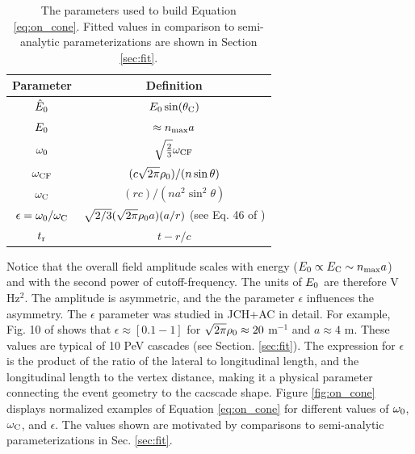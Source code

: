 \documentclass[amsmath,amssymb,aps,prd,10pt,twocolumn]{revtex4}
\begin{document}
\begin{table}
\renewcommand{\arraystretch}{1.5}
\begin{tabular}{| c | c |}
\hline
Parameter & Definition \\ \hline
$\hat{E}_{\rm 0}$ & $E_{\rm 0} \sin(\theta_{\rm C})$ \\
$E_{\rm 0}$ & $\approx n_{\rm max}a$ \\
$\omega_{\rm 0}$ & $\sqrt{\frac{2}{3}} \omega_{\rm CF}$ \\
$\omega_{\rm CF}$ & $(c\sqrt{2\pi}\rho_{\rm 0})/(n\sin\theta)$ \\
$\omega_{\rm C}$ & $(rc)/(na^2\sin^2\theta)$ \\
$\epsilon = \omega_{\rm 0}/\omega_{\rm C}$ & $\sqrt{2/3} (\sqrt{2\pi} \rho_{\rm 0} a) (a/r) $ (see Eq. 46 of \cite{10.1016/j.astropartphys.2017.03.008}) \\
$t_{\rm r}$ & $t - r/c$ \\ \hline
\end{tabular}
\caption{\label{tab:features_1} The parameters used to build Equation \ref{eq:on_cone}.  Fitted values in comparison to semi-analytic parameterizations are shown in Section \ref{sec:fit}.}
\end{table} 

Notice that the overall field amplitude scales with energy ($E_{\rm 0} \propto E_{\rm C} \sim n_{\rm max} a$) and with the second power of cutoff-frequency.  The units of $E_{\rm 0}$ are therefore V Hz$^2$.  The amplitude is asymmetric, and the the parameter $\epsilon$ influences the asymmetry.  The $\epsilon$ parameter was studied in JCH+AC in detail.  For example, Fig. 10 of \cite{10.1016/j.astropartphys.2017.03.008} shows that $\epsilon \approx [0.1 - 1]$ for $\sqrt{2\pi} \rho_{\rm 0} \approx 20$ m$^{-1}$ and $a \approx 4$ m.  These values are typical of 10 PeV cascades (see Section. \ref{sec:fit}).  The expression for $\epsilon$ is the product of the ratio of the lateral to longitudinal length, and the longitudinal length to the vertex distance, making it a physical parameter connecting the event geometry to the cacscade shape.  Figure \ref{fig:on_cone} displays normalized examples of Equation \ref{eq:on_cone} for different values of $\omega_{\rm 0}$, $\omega_{\rm C}$, and $\epsilon$.  The values shown are motivated by comparisons to semi-analytic parameterizations in Sec. \ref{sec:fit}.
\end{document}
